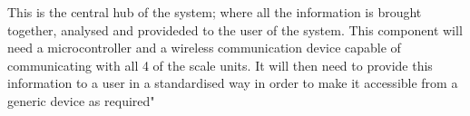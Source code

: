This is the central hub of the system; where all the information is brought together, analysed and provideded to the user of the system. This component will need a microcontroller and a wireless communication device capable of communicating with all 4 of the scale units. It will then need to provide this information to a user in a standardised way in order to make it accessible from a generic device as required"
